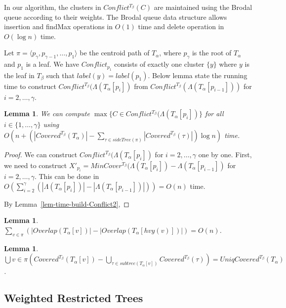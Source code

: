 \documentclass[final,1p,times]{elsarticle}
\newcommand{\TA}{T_\alpha}
\newcommand{\TB}{T_\beta}
\newtheorem{lemma}[theorem]{Lemma}
\begin{document}
    In our algorithm, the clusters in $Conflict^{\TB}(C)$ are maintained using the Brodal queue according to their weights.
    The Brodal queue data structure allows insertion and findMax operations in $O(1)$ time and delete operation in $O(\log n)$ time.

    Let $\pi = \langle p_{\gamma}, p_{\gamma - 1}, \dots, p_1 \rangle$ be the centroid path of $\TA$, where $p_{\gamma}$ is the root of $\TA$ and $p_1$ is a leaf.
    We have $Conflict_{p_1}$ consists of exactly one cluster $\{y\}$ where $y$ is the leaf in $T_{\beta}$ such that $label(y) = label(p_1)$.
    Below lemma state the running time to construct $Conflict^{\TB}(\Lambda(\TA[p_i])$ from $Conflict^{\TB}(\Lambda(\TA[p_{i-1}]))$ for $i = 2, \ldots, \gamma$.
    \begin{lemma}
	    We can compute $\max \{ C \in Conflict^{\TB}(\Lambda(\TA[p_i]) \}$ for all $i \in \{1, \ldots, \gamma\}$
	    using $O\left(n + \left( |Covered^{\TB}(\TA)| - \sum_{\tau \in sideTree(\pi)} |Covered^{\TB}(\tau)| \right) \log n \right)$ time.
    \end{lemma}
    \begin{proof}
	    We can construct $Conflict^{\TB}(\Lambda(\TA[p_i])$ for $i = 2, \ldots, \gamma$ one by one.
	    First, we need to construct $X'_{p_i} = MinCover^{\TB}(\Lambda(\TA[p_i]) - \Lambda(\TA[p_{i-1}])$ for $i = 2, \ldots, \gamma$.
	    This can be done in $O( \sum_{i=2}^{\gamma} (|\Lambda(\TA[p_i])| - |\Lambda(\TA[p_{i-1}])|) ) = O(n)$ time.

	    By Lemma~\ref{lem-time-build-Conflict2},


    \end{proof}

    \begin{lemma}
	    $\sum_{v \in \pi} \left(|Overlap(T_{\alpha}[v])| - |Overlap(T_{\alpha}[hvy(v)])| \right) = O(n)$.
    \end{lemma}

    \begin{lemma}
	    $\bigcup{v \in \pi} \left( Covered^{\TB}(T_{\alpha}[v]) - \bigcup_{\tau \in subtree(T_{\alpha}[v])} Covered^{\TB}(\tau) \right) = UniqCovered^{\TB}(\TA)$.
    \end{lemma}

    \subsection{Weighted Restricted Trees}
    \label{subsec:restrictedweighted}
\end{document}
